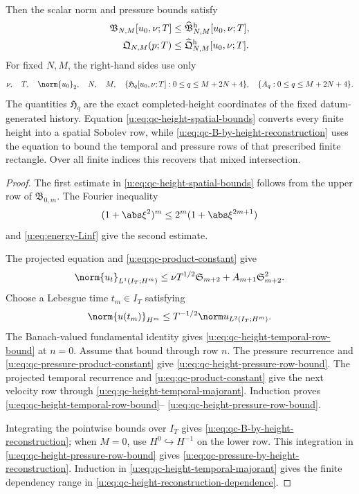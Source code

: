 \begin{proposition}
\begin{align}
\end{align}
Then the scalar norm and pressure bounds satisfy
\begin{align}
 \mathfrak B_{N,M}[u_0,\nu;T]
 &\le\widehat{\mathfrak B}_{N,M}^{\rm h}[u_0,\nu;T],
 \label{u:eq:qc-B-by-height-reconstruction}\\
 \mathfrak Q_{N,M}(p;T)
 &\le\widehat{\mathfrak Q}_{N,M}^{\rm h}[u_0,\nu;T].
 \label{u:eq:qc-pressure-by-height-reconstruction}
\end{align}
For fixed \(N,M\), the right-hand sides use only
\begin{equation}
 \nu,\quad T,\quad\norm{u_0}_2,\quad N,\quad M,\quad
 \{\mathfrak H_q[u_0,\nu;T]:0\le q\le M+2N+4\},
 \quad\{A_q:0\le q\le M+2N+4\}.
 \label{u:eq:qc-height-reconstruction-dependence}
\end{equation}
The quantities \(\mathfrak H_q\) are the exact completed-height coordinates
of the fixed datum-generated history.  Equation
\eqref{u:eq:qc-height-spatial-bounds} converts every finite height into a spatial
Sobolev row, while \eqref{u:eq:qc-B-by-height-reconstruction} uses the equation
to bound the temporal and pressure rows of that prescribed finite
rectangle.  Over all finite indices this recovers that mixed intersection.
\end{proposition}

\begin{proof}
The first estimate in \eqref{u:eq:qc-height-spatial-bounds} follows from the
upper row of \(\mathfrak B_{0,m}\).  The Fourier inequality
\[
 (1+\abs\xi^2)^m\le2^m(1+\abs\xi^{2m+1})
\]
and \eqref{u:eq:energy-Linf} give the second estimate.

The projected equation and \eqref{u:eq:qc-product-constant} give
\[
 \norm{u_t}_{L^1(I_T;H^m)}
 \le\nu T^{1/2}\mathfrak S_{m+2}
 +A_{m+1}\mathfrak S_{m+2}^2.
\]
Choose a Lebesgue time \(t_m\in I_T\) satisfying
\[
 \norm{u(t_m)}_{H^m}
 \le T^{-1/2}\norm u_{L^2(I_T;H^m)}.
\]
The Banach-valued fundamental identity gives
\eqref{u:eq:qc-height-temporal-row-bound} at \(n=0\).
Assume that bound through row \(n\).  The pressure recurrence and
\eqref{u:eq:qc-pressure-product-constant} give
\eqref{u:eq:qc-height-pressure-row-bound}.  The projected temporal recurrence
and \eqref{u:eq:qc-product-constant} give the next velocity row through
\eqref{u:eq:qc-height-temporal-majorant}.  Induction proves
\eqref{u:eq:qc-height-temporal-row-bound}--%
\eqref{u:eq:qc-height-pressure-row-bound}.

Integrating the pointwise bounds over \(I_T\) gives
\eqref{u:eq:qc-B-by-height-reconstruction}; when \(M=0\), use
\(H^0\hookrightarrow H^{-1}\) on the lower row.  This integration in
\eqref{u:eq:qc-height-pressure-row-bound} gives
\eqref{u:eq:qc-pressure-by-height-reconstruction}.  Induction in
\eqref{u:eq:qc-height-temporal-majorant} gives the finite dependency range in
\eqref{u:eq:qc-height-reconstruction-dependence}.
\end{proof}

